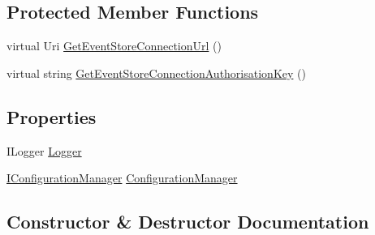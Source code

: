 \subsection*{Protected Member Functions}
\begin{DoxyCompactItemize}
\item 
virtual Uri \hyperlink{classCqrs_1_1Azure_1_1DocumentDb_1_1Events_1_1AzureDocumentDbEventStoreConnectionStringFactory_a53d282392000624128304c6477a2a466}{Get\+Event\+Store\+Connection\+Url} ()
\item 
virtual string \hyperlink{classCqrs_1_1Azure_1_1DocumentDb_1_1Events_1_1AzureDocumentDbEventStoreConnectionStringFactory_aa16b2178e1ca8893c120097f6dd47022}{Get\+Event\+Store\+Connection\+Authorisation\+Key} ()
\end{DoxyCompactItemize}
\subsection*{Properties}
\begin{DoxyCompactItemize}
\item 
I\+Logger \hyperlink{classCqrs_1_1Azure_1_1DocumentDb_1_1Events_1_1AzureDocumentDbEventStoreConnectionStringFactory_a5512879778ae56a8ee26baf52be1cdd3}{Logger}
\item 
\hyperlink{interfaceCqrs_1_1Configuration_1_1IConfigurationManager}{I\+Configuration\+Manager} \hyperlink{classCqrs_1_1Azure_1_1DocumentDb_1_1Events_1_1AzureDocumentDbEventStoreConnectionStringFactory_a17abd52e82be8c2dea8f5ef5edb53b85}{Configuration\+Manager}
\end{DoxyCompactItemize}


\subsection{Constructor \& Destructor Documentation}
\mbox{\label{classCqrs_1_1Azure_1_1DocumentDb_1_1Events_1_1AzureDocumentDbEventStoreConnectionStringFactory_a7503e00bedc6af5686ded0b6b7719a30}} 
